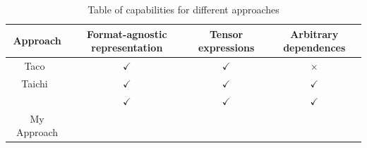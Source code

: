 \documentclass{article}
\newcommand{\yes}[0]{$\checkmark$}
\newcommand{\no}[0]{$\times$}
\begin{document}
\begin{table}
\begin{tabular}{|c|c|c|c|}
\hline
Approach & Format-agnostic representation & Tensor expressions & Arbitrary dependences \\
\hline
Taco~\cite{kjolstad2017tensor} & \yes & \yes & \no \\
Taichi~\cite{hu2019taichi} & \yes & \yes & \yes \\
\cite{ahmed2000framework} & \yes & \yes & \yes \\ 
My Approach & & & 
    
\end{tabular}
\caption{Table of capabilities for different approaches}
\label{MagicTable}
\end{table}







\end{document}
